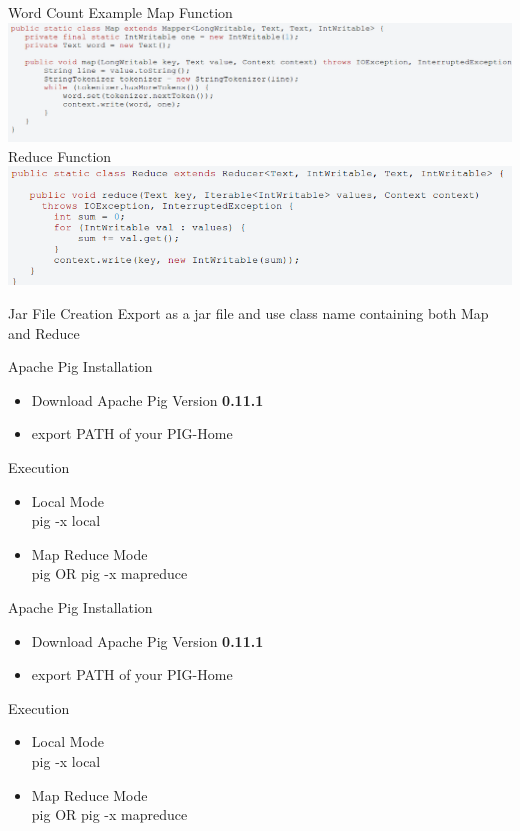 \documentclass{beamer}
\begin{document}
\begin{frame}{Word Count Example}
Map Function
\includegraphics[width=1.4\textwidth]{images/2.png} 
\\
Reduce Function
\includegraphics[width=1.3\textwidth]{images/3.png} 
\end{frame}

\begin{frame}{Jar File Creation}
Export as a jar file and use class name containing both Map and Reduce
\end{frame}

\begin{frame}{Apache Pig}
Installation
\begin{itemize}
\item Download Apache Pig Version \textbf{0.11.1}
\item export PATH of your PIG-Home
\end{itemize}
Execution
\begin{itemize}
\item Local Mode \\ pig -x local
\item Map Reduce Mode \\ pig OR pig -x mapreduce
\end{itemize}
\end{frame}


\begin{frame}{Apache Pig}
Installation
\begin{itemize}
\item Download Apache Pig Version \textbf{0.11.1}
\item export PATH of your PIG-Home
\end{itemize}
Execution
\begin{itemize}
\item Local Mode \\ pig -x local
\item Map Reduce Mode \\ pig OR pig -x mapreduce
\end{itemize}
\end{frame}
\end{document}

